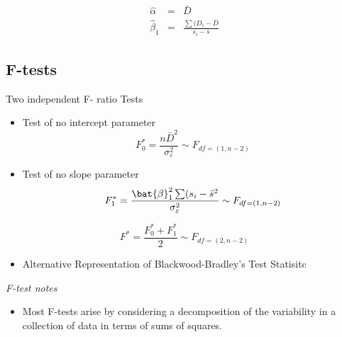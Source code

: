 \documentclass[12pt]{article}
\begin{document}
\begin{eqnarray}
\hat{\alpha} &=& \bar{D} \\
\hat{\beta}_1 &=& \frac{\sum(D_i - \bar{D}}{s_i - \bar{s}}
\end{eqnarray}
\newpage
\subsection{F-tests}

Two independent F- ratio Tests

\begin{itemize}
\item Test of no intercept parameter
\[ F^{\ast}_0 = \frac{n\bar{D}^2}{\sigma^2_\varepsilon} \sim F_{df = (1,n-2)}\]

\item Test of no slope parameter
\[ F^{\ast}_1 = \frac{ \bat{\beta}^2_1\sum(s_i-\bar{s}^2}{\sigma^2_\varepsilon} \sim F_{df = (1,n-2)}\]
\end{itemize}

\[ F^{\ast}  = \frac{F^{\ast}_0 + F^{\ast}_1 }{2} \sim F_{df = (2,n-2)}\]
\begin{itemize}
\item Alternative Representation of Blackwood-Bradley's Test Statisitc
\end{itemize}
\textit{F-test notes}
\begin{itemize}
\item Most F-tests arise by considering a decomposition of the variability in a collection of data in terms of sums of squares. 
\end{itemize}
\end{document}
